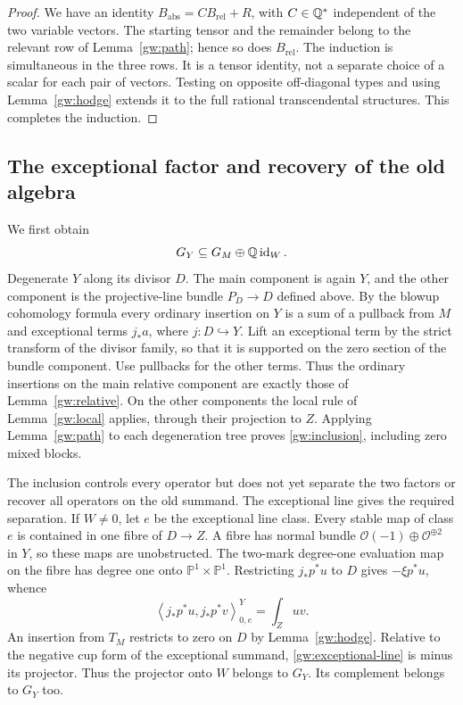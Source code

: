 \begin{proof}
We have an identity $B_{\mathrm{abs}}=C B_{\mathrm{rel}}+R$, with
$C\in\mathbb Q^*$ independent of the two variable vectors.  The starting tensor
and the remainder belong to the relevant row of Lemma~\ref{gw:path}; hence
so does $B_{\mathrm{rel}}$.  The induction is simultaneous in the three
rows.  It is a tensor identity, not a separate choice of a scalar for each
pair of vectors.  Testing on opposite off-diagonal types and using
Lemma~\ref{gw:hodge} extends it to the full rational transcendental
structures.  This completes the induction.
\end{proof}

\subsection{The exceptional factor and recovery of the old algebra}

We first obtain
\begin{equation}\label{gw:inclusion}
G_Y\subseteq G_M\oplus\mathbb Q\operatorname{id}_{W}.
\end{equation}
Degenerate $Y$ along its divisor $D$.  The main component is again $Y$,
and the other component is the projective-line bundle $P_D\to D$ defined above.
By the blowup cohomology formula every ordinary insertion on $Y$ is a sum
of a pullback from $M$ and exceptional terms $j_*a$, where $j:D\hookrightarrow
Y$.  Lift an exceptional term by the strict transform of the divisor family,
so that it is supported on the zero section of the bundle component.
Use pullbacks for the other terms.  Thus the ordinary insertions on the
main relative component are exactly those of Lemma~\ref{gw:relative}.
On the other components the local rule of Lemma~\ref{gw:local} applies,
through their projection to $Z$.  Applying Lemma~\ref{gw:path} to each
degeneration tree proves \eqref{gw:inclusion}, including zero mixed blocks.

The inclusion controls every operator but does not yet separate the two
factors or recover all operators on the old summand. The exceptional
line gives the required separation.
If $W\neq0$, let $e$ be the exceptional line class.  Every stable map of
class $e$ is contained in one fibre of $D\to Z$.  A fibre has normal bundle
$\mathcal O(-1)\oplus\mathcal O^{\oplus2}$ in $Y$, so these maps are
unobstructed.  The two-mark degree-one evaluation map on the fibre has
degree one onto $\mathbb P^1\times\mathbb P^1$.  Restricting
$j_*p^*u$ to $D$ gives $-\xi p^*u$, whence
\begin{equation}\label{gw:exceptional-line}
\left\langle j_*p^*u,j_*p^*v\right\rangle^Y_{0,e}
       =\int_Zuv.
\end{equation}
An insertion from $T_M$ restricts to zero on $D$ by
Lemma~\ref{gw:hodge}.  Relative to the negative cup form of the exceptional
summand, \eqref{gw:exceptional-line} is minus its projector.  Thus the
projector onto $W$ belongs to $G_Y$.  Its complement belongs to $G_Y$ too.

